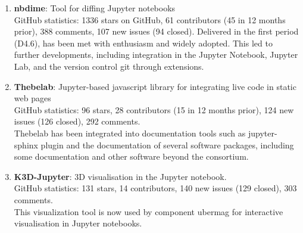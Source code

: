 \begin{enumerate}
\item \textbf{nbdime}: Tool for diffing Jupyter notebooks\\
  GitHub statistics: 1336 stars on GitHub, 61 contributors (45 in 12
  months prior), 388 comments, 107 new issues (94 closed). Delivered
  in the first period (D4.6),  has been met with
  enthusiasm and widely adopted. This led to further developments,
  including integration in the Jupyter Notebook,
  Jupyter Lab, and the version control git through extensions.
\item \textbf{Thebelab}: Jupyter-based javascript library for integrating live code in static web pages\\
  GitHub statistics: 96 stars, 28 contributors (15 in 12 months prior), 124 new issues (126 closed), 292 comments.\\
  Thebelab has been integrated into documentation tools such as jupyter-sphinx plugin
  and the documentation of several software packages,
  including some \SageMath documentation and other software beyond the \ODK consortium.
\item \textbf{K3D-Jupyter}: 3D visualisation in the Jupyter notebook.\\
  GitHub statistics: 131 stars, 14 contributors, 140 new issues (129 closed), 303 comments. \\
  This visualization tool is now used by \ODK component ubermag
  for interactive visualisation in Jupyter notebooks.
\end{enumerate}


